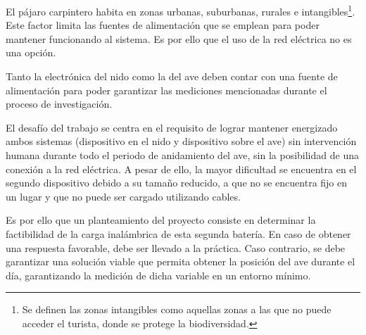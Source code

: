 El pájaro carpintero habita en zonas urbanas, suburbanas, rurales e intangibles\footnote{Se definen las zonas intangibles como aquellas zonas a las que no puede acceder el turista, donde se protege la biodiversidad.}. Este factor limita las fuentes de alimentación que se emplean para poder mantener funcionando al sistema. Es por ello que el uso de la red eléctrica no es una opción.

Tanto la electrónica del nido como la del ave deben contar con una fuente de alimentación para poder garantizar las mediciones mencionadas durante el proceso de investigación.

El desafío del trabajo se centra en el requisito de lograr mantener energizado ambos sistemas (dispositivo en el nido y dispositivo sobre el ave) sin intervención humana durante todo el periodo de anidamiento del ave, sin la posibilidad de una conexión a la red eléctrica. A pesar de ello, la mayor dificultad se encuentra en el segundo dispositivo debido a su tamaño reducido, a que no se encuentra fijo en un lugar y que no puede ser cargado utilizando cables.

Es por ello que un planteamiento del proyecto consiste en determinar la factibilidad de la carga inalámbrica de esta segunda batería. En caso de obtener una respuesta favorable, debe ser llevado a la práctica. Caso contrario, se debe garantizar una solución viable que permita obtener la posición del ave durante el día, garantizando la medición de dicha variable en un entorno mínimo.


